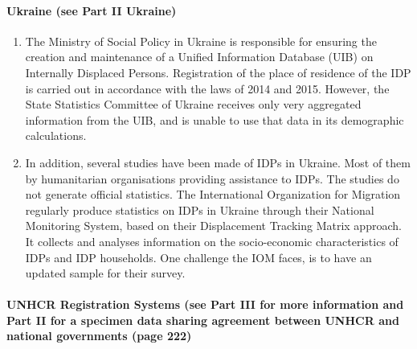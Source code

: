 \documentclass[
]{article}
\begin{document}
\hypertarget{ukraine-see-part-ii-ukraine}{%
\paragraph{Ukraine (see Part II Ukraine)}\label{ukraine-see-part-ii-ukraine}}

\begin{enumerate}
\def\labelenumi{\arabic{enumi}.}
\setcounter{enumi}{183}
\item
  The Ministry of Social Policy in Ukraine is responsible for
  ensuring the creation and maintenance of a Unified Information
  Database (UIB) on Internally Displaced Persons. Registration of the
  place of residence of the IDP is carried out in accordance with the
  laws of 2014 and 2015. However, the State Statistics Committee of
  Ukraine receives only very aggregated information from the UIB, and
  is unable to use that data in its demographic calculations.
\item
  In addition, several studies have been made of IDPs in Ukraine.
  Most of them by humanitarian organisations providing assistance to
  IDPs. The studies do not generate official statistics. The
  International Organization for Migration regularly produce
  statistics on IDPs in Ukraine through their National Monitoring
  System, based on their Displacement Tracking Matrix approach. It
  collects and analyses information on the socio-economic
  characteristics of IDPs and IDP households. One challenge the IOM
  faces, is to have an updated sample for their survey.
\end{enumerate}

\hypertarget{unhcr-registration-systems-see-part-iii-for-more-information-and-part-ii-for-a-specimen-data-sharing-agreement-between-unhcr-and-national-governments-page-222}{%
\paragraph{UNHCR Registration Systems (see Part III for more information and Part II for a specimen data sharing agreement between UNHCR and national governments (page 222)}\label{unhcr-registration-systems-see-part-iii-for-more-information-and-part-ii-for-a-specimen-data-sharing-agreement-between-unhcr-and-national-governments-page-222}}
\end{document}
